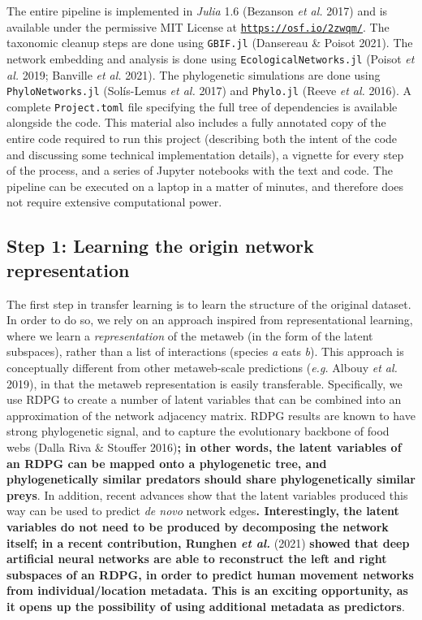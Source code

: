 \documentclass[11pt]{article}
\makeatletter
\def\maxwidth{\ifdim\Gin@nat@width>\linewidth\linewidth
\else\Gin@nat@width\fi}
\let\Oldincludegraphics\includegraphics
\renewcommand{\includegraphics}[1]{\Oldincludegraphics[width=\maxwidth]{#1}}
\providecommand{\DIFaddtex}[1]{{\bf #1}} %
\providecommand{\DIFdeltex}[1]{} %
\providecommand{\DIFaddbegin}{\protect\color{blue}} %
\providecommand{\DIFaddend}{\protect\color{black}} %
\providecommand{\DIFdelbegin}{\protect\color{red}} %
\providecommand{\DIFdelend}{\protect\color{black}} %
\providecommand{\DIFadd}[1]{\texorpdfstring{\DIFaddtex{#1}}{#1}} %
\providecommand{\DIFdel}[1]{\texorpdfstring{\DIFdeltex{#1}}{}} %
\newcommand{\DIFscaledelfig}{0.5}
\newlength{\DIFdelgraphicswidth} %
\newlength{\DIFdelgraphicsheight} %
\newcommand{\DIFaddincludegraphics}[2][]{{\color{blue}\fbox{\DIFOincludegraphics[#1]{#2}}}} %
\newcommand{\DIFdelincludegraphics}[2][]{%
\sbox{\DIFdelgraphicsbox}{\DIFOincludegraphics[#1]{#2}}%
\settoboxwidth{\DIFdelgraphicswidth}{\DIFdelgraphicsbox} %
\settoboxtotalheight{\DIFdelgraphicsheight}{\DIFdelgraphicsbox} %
\scalebox{\DIFscaledelfig}{%
\parbox[b]{\DIFdelgraphicswidth}{\usebox{\DIFdelgraphicsbox}\\[-\baselineskip] \rule{\DIFdelgraphicswidth}{0em}}\llap{\resizebox{\DIFdelgraphicswidth}{\DIFdelgraphicsheight}{%
\setlength{\unitlength}{\DIFdelgraphicswidth}%
\begin{picture}(1,1)%
\thicklines\linethickness{2pt} %
{\color[rgb]{1,0,0}\put(0,0){\framebox(1,1){}}}%
{\color[rgb]{1,0,0}\put(0,0){\line( 1,1){1}}}%
{\color[rgb]{1,0,0}\put(0,1){\line(1,-1){1}}}%
\end{picture}%
}\hspace*{3pt}}} %
} %
\DeclareRobustCommand{\DIFaddbegin}{\DIFOaddbegin \let\includegraphics\DIFaddincludegraphics} %
\DeclareRobustCommand{\DIFaddend}{\DIFOaddend \let\includegraphics\DIFOincludegraphics} %
\DeclareRobustCommand{\DIFdelbegin}{\DIFOdelbegin \let\includegraphics\DIFdelincludegraphics} %
\DeclareRobustCommand{\DIFdelend}{\DIFOaddend \let\includegraphics\DIFOincludegraphics} %
\makeatother
\begin{document}
The entire pipeline is implemented in \emph{Julia} 1.6 (Bezanson
\emph{et al.} 2017) and is available under the permissive MIT License at
\href{https://osf.io/2zwqm/}{\texttt{https://osf.io/2zwqm/}}. The
taxonomic cleanup steps are done using \texttt{GBIF.jl} (Dansereau \&
Poisot 2021). The network embedding and analysis is done using
\texttt{EcologicalNetworks.jl} (Poisot \emph{et al.} 2019; Banville
\emph{et al.} 2021). The phylogenetic simulations are done using
\texttt{PhyloNetworks.jl} (Solís-Lemus \emph{et al.} 2017) and
\texttt{Phylo.jl} (Reeve \emph{et al.} 2016). A complete
\texttt{Project.toml} file specifying the full tree of dependencies is
available alongside the code. This material also includes a fully
annotated copy of the entire code required to run this project
(describing both the intent of the code and discussing some technical
implementation details), a vignette for every step of the process, and a
series of Jupyter notebooks with the text and code. The pipeline can be
executed on a laptop in a matter of minutes, and therefore does not
require extensive computational power.

\hypertarget{step-1-learning-the-origin-network-representation}{%
\subsection{Step 1: Learning the origin network
representation}\label{step-1-learning-the-origin-network-representation}}

The first step in transfer learning is to learn the structure of the
original dataset. In order to do so, we rely on an approach inspired
from representational learning, where we learn a \emph{representation}
of the metaweb (in the form of the latent subspaces), rather than a list
of interactions (species \emph{a} eats \emph{b}). This approach is
conceptually different from other metaweb-scale predictions (\emph{e.g.}
Albouy \emph{et al.} 2019), in that the metaweb representation is easily
transferable. Specifically, we use RDPG to create a number of latent
variables that can be combined into an approximation of the network
adjacency matrix. RDPG results are known to have strong phylogenetic
signal, and to capture the evolutionary backbone of food webs (Dalla
Riva \& Stouffer 2016)\DIFaddbegin \DIFadd{; in other words, the latent variables of an RDPG
can be mapped onto a phylogenetic tree, and phylogenetically similar
predators should share phylogenetically similar preys}\DIFaddend . In addition,
recent advances show that the latent variables produced this way can be
used to predict \emph{de novo} network edges\DIFaddbegin \DIFadd{. Interestingly, the latent
variables do not need to be produced by decomposing the network itself;
in a recent contribution, Runghen \emph{et al.} }\DIFaddend (\DIFdelbegin \DIFdel{\emph{i.e.} interactions;
Runghen \emph{et al.} }\DIFdelend 2021) \DIFaddbegin \DIFadd{showed that deep
artificial neural networks are able to reconstruct the left and right
subspaces of an RDPG, in order to predict human movement networks from
individual/location metadata. This is an exciting opportunity, as it
opens up the possibility of using additional metadata as predictors}\DIFaddend .
\end{document}
